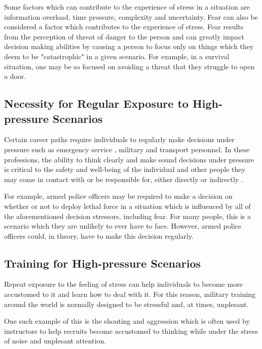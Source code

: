 \documentclass[12pt]{article}
\begin{document}
Some factors which can contribute to the experience of stress in a situation are information overload, time pressure, complexity and uncertainty. \cite{Phillips-Wren18082020} Fear can also be considered a factor which contributes to the experience of stress. \cite{klein2013effect} Fear results from the perception of threat of danger to the person and can greatly impact decision making abilities by causing a person to focus only on things which they deem to be "catastrophic" in a given scenario. \cite{chanel2009influence} For example, in a survival situation, one may be so focused on avoiding a threat that they struggle to open a door.

\subsection{Necessity for Regular Exposure to High-pressure Scenarios}

Certain career paths require individuals to regularly make decisions under pressure such as emergency service \cite{gullon2024prevalence}\cite{smith2011work}, military \cite{srivastava2023occupational}\cite{hellewell2018measuring}\cite{fear2009job} and transport \cite{jiao2023physiological}\cite{cahill2021pilot} personnel. In these professions, the ability to think clearly and make sound decisions under pressure is critical to the safety and well-being of the individual and other people they may come in contact with or be responsible for, either directly or indirectly \cite{mcfarlane2021investigating}. 

For example, armed police officers may be required to make a decision on whether or not to deploy lethal force in a situation which is influenced by all of the aforementioned decision stressors, including fear. For many people, this is a scenario which they are unlikely to ever have to face. However, armed police officers could, in theory, have to make this decision regularly. 

\subsection{Training for High-pressure Scenarios}

Repeat exposure to the feeling of stress can help individuals to become more accustomed to it and learn how to deal with it. For this reason, military training around the world is normally designed to be stressful and, at times, unplesant. 

One such example of this is the shouting and aggression which is often used by instructors to help recruits become accustomed to thinking while under the stress of noise and unplesant attention.
\end{document}
